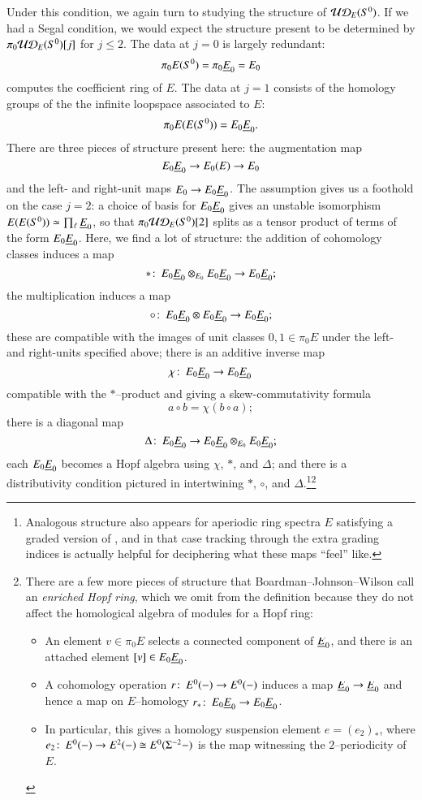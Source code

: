 Under this condition, we again turn to studying the structure of $\mathcal{UD}_E(S^0)$.  If we had a Segal condition, we would expect the structure present to be determined by $\pi_0 \mathcal{UD}_E(S^0)[j]$ for $j \le 2$.  The data at $j = 0$ is largely redundant: \[\pi_0 E(S^0) = \pi_0 \underline{\smash{E}}_{0} = E_0\] computes the coefficient ring of $E$.  The data at $j = 1$ consists of the homology groups of the the infinite loopspace associated to $E$: \[\pi_0 E(E(S^0)) = E_0 \underline{\smash{E}}_{0}.\]  There are three pieces of structure present here: the augmentation map \[E_0 \underline{\smash{E}}_{0} \to E_0(E) \to E_0\] and the left- and right-unit maps $E_0 \to E_0 \underline{\smash{E}}_{0}$.  The assumption {\UFH} gives us a foothold on the case $j = 2$: a choice of basis for $E_0 \underline{\smash{E}}_{0}$ gives an unstable isomorphism $E(E(S^0)) \simeq \prod_\ell \underline{\smash{E}}_{0}$, so that $\pi_0 \mathcal{UD}_E(S^0)[2]$ splits as a tensor product of terms of the form $E_0 \underline{\smash{E}}_{0}$.  Here, we find a lot of structure: the addition of cohomology classes induces a map \[\ast\colon\thinspace E_0 \underline{\smash{E}}_{0} \otimes_{E_0} E_0 \underline{\smash{E}}_{0} \to E_0 \underline{\smash{E}}_{0};\] the multiplication induces a map \[\circ\colon\thinspace E_0 \underline{\smash{E}}_{0} \otimes E_0 \underline{\smash{E}}_{0} \to E_0 \underline{\smash{E}}_{0};\] these are compatible with the images of unit classes $0, 1 \in \pi_0 E$ under the left- and right-units specified above; there is an additive inverse map \[\chi\colon\thinspace E_0 \underline{\smash{E}}_{0} \to E_0 \underline{\smash{E}}_{0}\] compatible with the $\ast$--product and giving a skew-commutativity formula \[a \circ b = \chi(b \circ a);\] there is a diagonal map \[\Delta\colon\thinspace E_0 \underline{\smash{E}}_{0} \to E_0 \underline{\smash{E}}_{0} \otimes_{E_0} E_0 \underline{\smash{E}}_{0};\] each $E_0 \underline{\smash{E}}_{0}$ becomes a Hopf algebra using $\chi$, $\ast$, and $\Delta$; and there is a distributivity condition pictured in  intertwining $\ast$, $\circ$, and $\Delta$.\footnote{Analogous structure also appears for aperiodic ring spectra $E$ satisfying a graded version of {\UFH}, and in that case tracking through the extra grading indices is actually helpful for deciphering what these maps ``feel'' like.}\footnote{There are a few more pieces of structure that Boardman--Johnson--Wilson call an \textit{enriched Hopf ring}, which we omit from the definition because they do not affect the homological algebra of modules for a Hopf ring:
\begin{itemize}
\item An element $v \in \pi_0 E$ selects a connected component of $\underline{\smash{E}}_{0}$, and there is an attached element $[v] \in E_0 \underline{\smash{E}}_{0}$.
\item A cohomology operation $r\colon\thinspace E^0(-) \to E^0(-)$ induces a map $\underline{\smash{E}}_{0} \to \underline{\smash{E}}_{0}$ and hence a map on $E$--homology $r_*\colon\thinspace E_0 \underline{\smash{E}}_{0} \to E_0 \underline{\smash{E}}_{0}$.
\item In particular, this gives a homology suspension element $e = (e_2)_*$, where $e_2\colon\thinspace E^0(-) \to E^2(-) \cong E^0(\Sigma^{-2} -)$ is the map witnessing the $2$--periodicity of $E$.
\end{itemize}}

